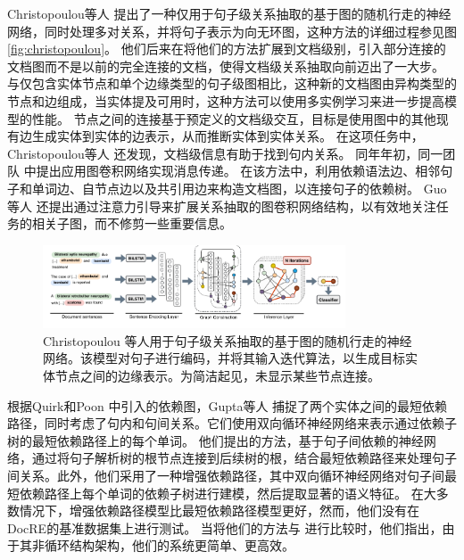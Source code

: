 \documentclass[bachelor]{thesis-uestc}
\begin{document}
Christopoulou等人 \cite{christopoulou-etal-2018-walk} 提出了一种仅用于句子级关系抽取的基于图的随机行走的神经网络，同时处理多对关系，并将句子表示为向无环图，这种方法的详细过程参见图\ref{fig:christopoulou}。
他们后来在将他们的方法扩展到文档级别，引入部分连接的文档图而不是以前的完全连接的文档，使得文档级关系抽取向前迈出了一大步。
与仅包含实体节点和单个边缘类型的句子级图相比，这种新的文档图由异构类型的节点和边组成，当实体提及可用时，这种方法可以使用多实例学习来进一步提高模型的性能。
节点之间的连接基于预定义的文档级交互，目标是使用图中的其他现有边生成实体到实体的边表示，从而推断实体到实体关系。
在这项任务中，Christopoulou等人 \cite{christopoulou-etal-2019-connecting}还发现，文档级信息有助于找到句内关系。
同年年初，同一团队 \cite{sahu2019inter}中提出应用图卷积网络实现消息传递。
在该方法中，利用依赖语法边、相邻句子和单词边、自节点边以及共引用边来构造文档图，以连接句子的依赖树。
Guo等人 \cite{guo-etal-2019-attention}还提出通过注意力引导来扩展关系抽取的图卷积网络结构，以有效地关注任务的相关子图，而不修剪一些重要信息。\par
\begin{figure}
    \centering
    \includegraphics[width=0.8\textwidth]{misc/DAG2018.png}
    \caption{Christopoulou \cite{christopoulou-etal-2018-walk} 等人用于句子级关系抽取的基于图的随机行走的神经网络。该模型对句子进行编码，并将其输入迭代算法，以生成目标实体节点之间的边缘表示。为简洁起见，未显示某些节点连接。}
\end{figure}\label{fig:christopoulou}


根据Quirk和Poon \cite{quirk-poon-2017-distant} 中引入的依赖图，Gupta等人 \cite{Gupta_Rajaram_Schütze_Runkler_2019} 捕捉了两个实体之间的最短依赖路径，同时考虑了句内和句间关系。它们使用双向循环神经网络来表示通过依赖子树的最短依赖路径上的每个单词。
他们提出的方法，基于句子间依赖的神经网络，通过将句子解析树的根节点连接到后续树的根，结合最短依赖路径来处理句子间关系。此外，他们采用了一种增强依赖路径，其中双向循环神经网络对句子间最短依赖路径上每个单词的依赖子树进行建模，然后提取显著的语义特征。
在大多数情况下，增强依赖路径模型比最短依赖路径模型更好，然而，他们没有在DocRE的基准数据集上进行测试。
当将他们的方法与 \cite{peng-etal-2017-cross}进行比较时，他们指出，由于其非循环结构架构，他们的系统更简单、更高效。\par
\end{document}
